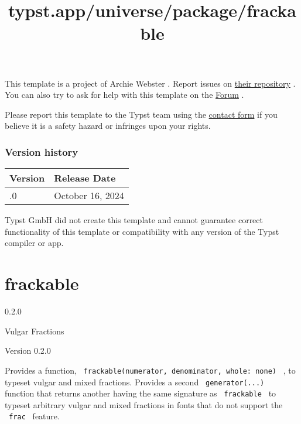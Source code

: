 This template is a project of Archie Webster . Report issues on
\href{https://github.com/artomweb/Quick-Sip-Typst-Template}{their
repository} . You can also try to ask for help with this template on the
\href{https://forum.typst.app}{Forum} .

Please report this template to the Typst team using the
\href{https://typst.app/contact}{contact form} if you believe it is a
safety hazard or infringes upon your rights.

\label{versions}
\subsubsection{Version history}\label{version-history}

\begin{longtable}[]{@{}ll@{}}
\toprule\noalign{}
Version & Release Date \\
\midrule\noalign{}
\endhead
\bottomrule\noalign{}
\endlastfoot
0.1.0 & October 16, 2024 \\
\end{longtable}

Typst GmbH did not create this template and cannot guarantee correct
functionality of this template or compatibility with any version of the
Typst compiler or app.


\title{typst.app/universe/package/frackable}

\label{banner}
\section{frackable}\label{frackable}

{ 0.2.0 }

Vulgar Fractions

\label{readme}
Version 0.2.0

Provides a function,
\texttt{\ frackable(numerator,\ denominator,\ whole:\ none)\ } , to
typeset vulgar and mixed fractions. Provides a second
\texttt{\ generator(...)\ } function that returns another having the
same signature as \texttt{\ frackable\ } to typeset arbitrary vulgar and
mixed fractions in fonts that do not support the \texttt{\ frac\ }
feature.

\begin{Shaded}
\begin{Highlighting}[]

\end{Highlighting}
\end{Shaded}

